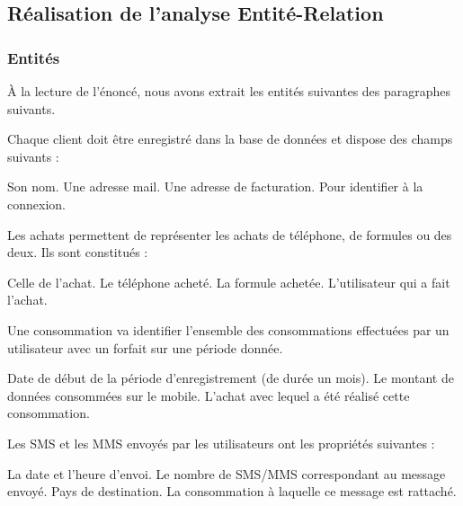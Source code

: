 \subsection{Réalisation de l'analyse Entité-Relation}

\subsubsection{Entités}

À la lecture de l'énoncé, nous avons extrait les entités suivantes des paragraphes suivants.

Chaque client doit être enregistré dans la base de données et dispose des champs suivants :
\begin{multicols}{2}
  \begin{itemize}
    Son nom.
    Une adresse mail.
    Une adresse de facturation.
    Pour identifier à la connexion.
  \end{itemize}
\end{multicols}

Les achats permettent de représenter les achats de téléphone, de formules ou des deux. Ils sont constitués :
\begin{multicols}{2}
  \begin{itemize}
    Celle de l'achat.
    Le téléphone acheté.
    La formule achetée.
    L'utilisateur qui a fait l'achat.
  \end{itemize}
\end{multicols}

Une consommation va identifier l'ensemble des consommations effectuées par un utilisateur avec un forfait sur une période donnée.
\begin{multicols}{2}
  \begin{itemize}
    Date de début de la période d'enregistrement (de durée un mois).
    Le montant de données consommées sur le mobile.
    L'achat avec lequel a été réalisé cette consommation.
  \end{itemize}
\end{multicols}

Les SMS et les MMS envoyés par les utilisateurs ont les propriétés suivantes :
\begin{multicols}{2}
  \begin{itemize}
    La date et l'heure d'envoi.
    Le nombre de SMS/MMS correspondant au message envoyé.
    Pays de destination.
    La consommation à laquelle ce message est rattaché.
  \end{itemize}
\end{multicols}


